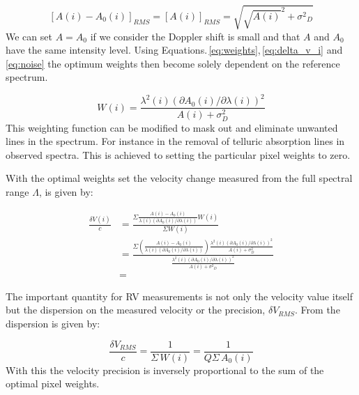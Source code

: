 \begin{equation}
{[{A(i)-A_0(i)}]}_{RMS} = {[{A(i)}]}_{RMS} = \sqrt{{\sqrt{A(i)}}^2 + {\sigma^2}_{D}} \label{eq:noise}
\end{equation}
We can set \(A = A_0\) if we consider the Doppler shift is small and that \(A\) and \(A_0\) have the same intensity level. Using Equations.\,\ref{eq:weights},\,\ref{eq:delta_v_i} and\,\ref{eq:noise} the optimum weights then become solely dependent on the reference spectrum.



\begin{equation}
W(i) = \frac{{\lambda}^{2}(i) {({\partial A_0(i)}/{\partial \lambda(i)})}^{2}}{A(i) + {\sigma}^{2}_{D}} \label{eq:optimal_weight}
\end{equation}
This weighting function can be modified to mask out and eliminate unwanted lines in the spectrum. For instance in the removal of telluric absorption lines in observed spectra. This is achieved to setting the particular pixel weights to zero.

With the optimal weights set the velocity change measured from the full spectral range \(\Lambda\),  is given by:


\begin{eqnarray}
    \frac{\delta V(i)}{c} &= \frac{
    	\Sigma{
        	\frac{
            	A(i) - A_0(i)}{
                \lambda(i) \left({\partial A_0(i)}/{\partial \lambda(i)}\right)} W(i)}}{
             \Sigma {W(i)}} \\
    &= \frac{
    	\Sigma  {
        	(\frac
            	{A(i) - A_0(i)}
                {\lambda(i) (\partial A_0(i)/\partial \lambda(i))}) \frac
                	{\lambda^2(i) {({\partial A_0(i)}/{\partial \lambda(i)})}^{2}}
                    {A(i) + {\sigma}^{2}_{D}}
                 }
         }
    {\frac
    	{\lambda^2(i) {({\partial A_0(i)}/{\partial \lambda(i)})}^{2}}{A(i) + {{\sigma}^{2}}_{D}}
        } \\
    &=
    \label{eq:delta_v_eqarray}
\end{eqnarray}

The important quantity for RV measurements is not only the velocity value itself but the dispersion on the measured velocity or the precision, \(\delta V_{RMS}\). From  the dispersion is given by:


\begin{equation}
    \frac{\delta V_{RMS}}{c} = \frac{1}{\Sigma {\,W(i)}} = \frac{1}{Q \Sigma {\,A_0(i)}} \label{eq:dv_rms}
\end{equation}
With this the velocity precision is inversely proportional to the sum of the optimal pixel weights.

